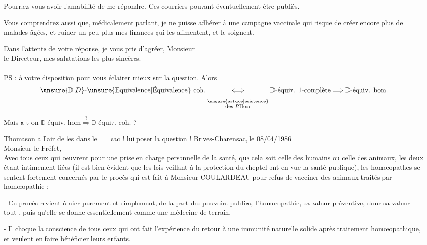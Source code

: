 Pourriez vous avoir l'amabilité de me répondre. Ces courriers pouvant éventuellement être publiés.

Vous comprendrez aussi que, médicalement parlant, je ne puisse adhérer à une campagne vaccinale qui risque de créer encore plus de malades âgées, et ruiner un peu plus mes finances qui les alimentent, et le soignent.

Dans l'attente de votre réponse, je vous prie d'agréer, Monsieur\\
le Directeur, mes salutations les plus sincères.\\

\\

PS : à votre disposition pour vous éclairer mieux sur la question.
Alors
\[
\unsure{\mathbb D|D}\text{-\unsure{Equivalence|Équivalence} coh.}
\underset{\substack{\vert\\\text{\unsure{astuce|existence}}\\\text{des }R\mathrm{Hom}}}{\Longleftrightarrow}
\mathbb D\text{-équiv. 1-complète}\Longrightarrow\mathbb D\text{-équiv. hom.}
\]

Mais a-t-on $\mathbb D\text{-équiv. hom}\overset{?}{\Longrightarrow}\mathbb D\text{-équiv. coh.}$ ?

Thomason a l'air de les  dans le $=$ sac ! lui poser la question !
Brives-Charensac, le 08/04/1986\\
Monsieur le Préfet,\\

Avec tous ceux qui oeuvrent pour une prise en charge personnelle de la santé, que cela soit celle des humains ou celle des animaux, les deux étant intimement liées (il est bien évident que les lois veillant à la protection du cheptel ont en vue la santé publique), les homœopathes se sentent fortement concernés par le procès qui est fait à Monsieur COULARDEAU pour refus de vacciner des animaux traités par homœopathie :

- Ce procès revient à nier purement et simplement, de la part des pouvoirs publics, l'homœopathie, sa valeur préventive, donc sa valeur tout , puis qu'elle se donne essentiellement comme une médecine de terrain.

- Il choque la conscience de tous ceux qui ont fait l'expérience du retour à une immunité naturelle solide après traitement homœopathique, et veulent en faire bénéficier leurs enfants.

